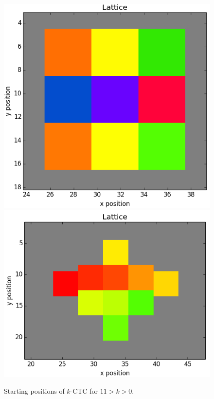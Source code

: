 \documentclass[12pt]{article}
\begin{document}
\begin{figure}[h]
	\includegraphics[scale=0.20]{img/9ctc_start}
	\includegraphics[scale=0.20]{img/10ctc_start}
	\caption{Starting positions of $k$-CTC for $11>k>0$.}
	\label{racestart}
\end{figure}
\end{document}

